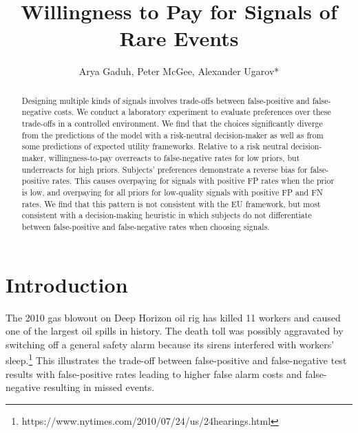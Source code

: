 \documentclass[12pt,a4paper]{article}
\title{\Large Willingness to Pay for Signals of Rare Events\\}
\author{\large Arya Gaduh, Peter McGee, Alexander Ugarov*}
\begin{document}
\maketitle
\onehalfspacing
\begin{abstract}{Designing multiple kinds of signals involves trade-offs between false-positive and false-negative costs. We conduct a laboratory experiment to evaluate preferences over these trade-offs in a controlled environment. We find that the choices significantly diverge from the predictions of the model with a risk-neutral decision-maker as well as from some predictions of expected utility frameworks. Relative to a risk neutral decision-maker, willingness-to-pay overreacts to false-negative rates for low priors, but underreacts for high priors. Subjects' preferences demonstrate a reverse bias for false-positive rates. This causes overpaying for signals with positive FP rates when the prior is low, and overpaying for all priors for low-quality signals with positive FP and FN rates. We find that this pattern is not consistent with the EU framework, but most consistent with a decision-making heuristic in which subjects do not differentiate between false-positive and false-negative rates when choosing signals.}


\vspace{10pt}
\begin{singlespace}

\end{singlespace}
\end{abstract}

\vspace{180pt}
\newpage
\normalsize

\section{Introduction}

The 2010 gas blowout on Deep Horizon oil rig has killed 11 workers and caused one of the largest oil spills in history. The death toll was possibly aggravated by switching off a general safety alarm because its sirens interfered with workers' sleep.\footnote{https://www.nytimes.com/2010/07/24/us/24hearings.html} This illustrates the trade-off between false-positive and false-negative test results with false-positive rates leading to higher false alarm costs and false-negative resulting in missed events. 
\end{document}
